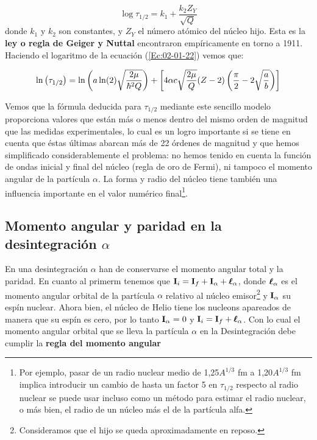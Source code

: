 \begin{equation}
    \log \tau_{1/2} = k_1 + \frac{k_2 Z_Y}{\sqrt{Q}}
\end{equation}
donde $k_1$ y $k_2$ son constantes, y $Z_Y$ el número atómico del núcleo hijo. Esta es la \textbf{ley o regla de Geiger y Nuttal} encontraron empíricamente en torno a 1911. Haciendo el logaritmo de la ecuación (\ref{Ec:02-01-22}) vemos que:

\begin{equation}
	\ln \left( \tau_{1/2} \right) = \ln\left( a \ln(2) \sqrt{\frac{2\mu}{\hbar^2Q}} \right)  +  \left[ 4 \alpha c \sqrt{\frac{2 \mu}{Q}} (Z-2) \left( \frac{\pi}{2}-2\sqrt{\frac{a}{b}} \right) \right]
	\label{Ec:02-01-24}
\end{equation}

Vemos que la fórmula deducida para $\tau_{1/2}$ mediante este sencillo modelo proporciona valores que están más o menos dentro del mismo orden de magnitud que las medidas experimentales, lo cual es un logro importante si se tiene en cuenta que éstas últimas abarcan más de 22 órdenes de magnitud y que hemos simplificado considerablemente el problema: no hemos tenido en cuenta la función de ondas inicial y final del núcleo (regla de oro de Fermi), ni tampoco el momento angular de la partícula $\alpha$. La forma y radio del núcleo tiene también una influencia importante en el valor numérico final\footnote{Por ejemplo, pasar de un radio nuclear medio de 1,25$A^{1/3}$ fm a 1,20$A^{1/3}$ fm implica introducir un cambio de hasta un factor 5 en $\tau_{1/2}$ respecto al radio nuclear se puede usar incluso como un método para estimar el radio nuclear, o más bien, el radio de un núcleo más el de la partícula alfa.}.


\subsection{Momento angular y paridad en la desintegración $\alpha$}

En una desintegración $\alpha$ han de conservarse el momento angular total y la paridad. En cuanto al primerm tenemos que $\mathbf{I}_i = \mathbf{I}_f + \mathbf{I}_\alpha + \boldsymbol{\ell}_\alpha$, donde $\boldsymbol{\ell}_\alpha$ es el momento angular orbital de la partícula $\alpha$ relativo al núcleo emisor\footnote{Consideramos que el hijo se queda aproximadamente en reposo.} y $\mathbf{I}_\alpha$ su espín nuclear. Ahora bien, el núcleo de Helio tiene los nucleons apareados de manera que su espín es cero, por lo tanto $\mathbf{I}_\alpha  =0$ y $\mathbf{I}_i = \mathbf{I}_f + \boldsymbol{\ell}_\alpha$. Con lo cual el momento angular orbital que se lleva la partícula $\alpha$ en la Desintegración debe cumplir la \textbf{regla del momento angular}

